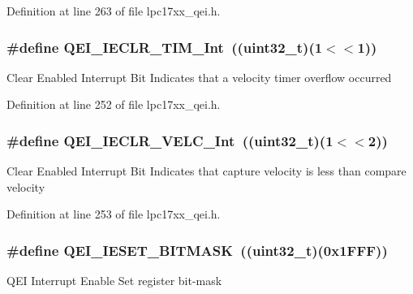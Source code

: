 \-Definition at line 263 of file lpc17xx\-\_\-qei.\-h.

\hypertarget{group___q_e_i___private___macros_gac179ad16287991eb902b0672ce2d6618}{
\subsubsection[{\-Q\-E\-I\-\_\-\-I\-E\-C\-L\-R\-\_\-\-T\-I\-M\-\_\-\-Int}]{\setlength{\rightskip}{0pt plus 5cm}\#define {\bf \-Q\-E\-I\-\_\-\-I\-E\-C\-L\-R\-\_\-\-T\-I\-M\-\_\-\-Int}~((uint32\-\_\-t)(1$<$$<$1))}}\label{group___q_e_i___private___macros_gac179ad16287991eb902b0672ce2d6618}
\-Clear \-Enabled \-Interrupt \-Bit \-Indicates that a velocity timer overflow occurred 

\-Definition at line 252 of file lpc17xx\-\_\-qei.\-h.

\hypertarget{group___q_e_i___private___macros_ga638f12e0824e0608cc4888511924c21d}{
\subsubsection[{\-Q\-E\-I\-\_\-\-I\-E\-C\-L\-R\-\_\-\-V\-E\-L\-C\-\_\-\-Int}]{\setlength{\rightskip}{0pt plus 5cm}\#define {\bf \-Q\-E\-I\-\_\-\-I\-E\-C\-L\-R\-\_\-\-V\-E\-L\-C\-\_\-\-Int}~((uint32\-\_\-t)(1$<$$<$2))}}\label{group___q_e_i___private___macros_ga638f12e0824e0608cc4888511924c21d}
\-Clear \-Enabled \-Interrupt \-Bit \-Indicates that capture velocity is less than compare velocity 

\-Definition at line 253 of file lpc17xx\-\_\-qei.\-h.

\hypertarget{group___q_e_i___private___macros_ga0261603cead4d95d04318dde6c7ca321}{
\subsubsection[{\-Q\-E\-I\-\_\-\-I\-E\-S\-E\-T\-\_\-\-B\-I\-T\-M\-A\-S\-K}]{\setlength{\rightskip}{0pt plus 5cm}\#define {\bf \-Q\-E\-I\-\_\-\-I\-E\-S\-E\-T\-\_\-\-B\-I\-T\-M\-A\-S\-K}~((uint32\-\_\-t)(0x1\-F\-F\-F))}}\label{group___q_e_i___private___macros_ga0261603cead4d95d04318dde6c7ca321}
\-Q\-E\-I \-Interrupt \-Enable \-Set register bit-\/mask 

